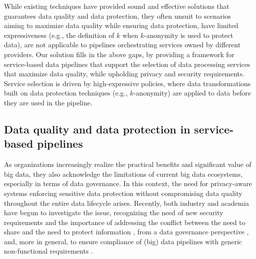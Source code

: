     {\color{OurColor} While existing techniques have provided sound and effective solutions that guarantees data quality and data protection, they often unsuit to scenarios aiming to maximize data quality while ensuring data protection, have limited expressiveness (e.g., the definition of $k$ when $k$-anonymity is used to protect data), are not applicable to pipelines orchestrating services owned by different providers. Our solution fills in the above gaps, by providing a framework for service-based data pipelines that support the selection of data processing services that maximize data quality, while upholding privacy and security requirements. Service selection is driven by high-expressive policies, where data transformations built on data protection techniques (e.g., $k$-anonymity) are applied to data before they are used in the pipeline.}

\subsection{Data quality and data protection in service-based pipelines}\label{sec:datagov}

As organizations increasingly realize the practical benefits and significant value of big data, they also acknowledge the limitations of current big data ecosystems, especially in terms of data governance. In this context, the need for privacy-aware systems enforcing sensitive data protection without compromising data quality throughout the entire data lifecycle arises. Recently, both industry and academia have begun to investigate the issue, recognizing the need of new security requirements \cite{Colombo:JournCybersec:2019} and the importance of addressing the conflict between the need to share and the need to protect information \cite{balancingact,VANDENBROEK2018330,balancingInMedicine,needtobalance,dataProtection}, from a data governance perspective \cite{al2018exploring,aissa2020decide}, and, more in general, to ensure compliance of (big) data pipelines with generic non-functional requirements \cite{ABBJ.ICWS2022,ABHKKS.BD2023}.

